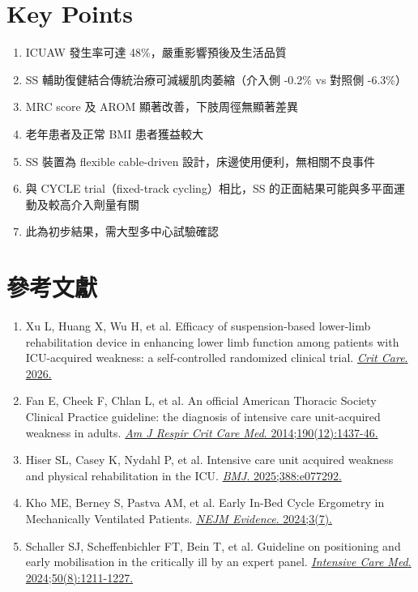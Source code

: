 \documentclass[11pt,a4paper]{article}
\begin{document}
\section{Key Points}

\begin{enumerate}
    \item ICUAW 發生率可達 48\%，嚴重影響預後及生活品質
    \item SS 輔助復健結合傳統治療可減緩肌肉萎縮（介入側 -0.2\% vs 對照側 -6.3\%）
    \item MRC score 及 AROM 顯著改善，下肢周徑無顯著差異
    \item 老年患者及正常 BMI 患者獲益較大
    \item SS 裝置為 flexible cable-driven 設計，床邊使用便利，無相關不良事件
    \item 與 CYCLE trial（fixed-track cycling）相比，SS 的正面結果可能與多平面運動及較高介入劑量有關
    \item 此為初步結果，需大型多中心試驗確認
\end{enumerate}

\section{參考文獻}

\begin{enumerate}
    \item Xu L, Huang X, Wu H, et al. Efficacy of suspension-based lower-limb rehabilitation device in enhancing lower limb function among patients with ICU-acquired weakness: a self-controlled randomized clinical trial. \href{https://doi.org/10.1186/s13054-026-05840-1}{\textit{Crit Care}. 2026.}

    \item Fan E, Cheek F, Chlan L, et al. An official American Thoracic Society Clinical Practice guideline: the diagnosis of intensive care unit-acquired weakness in adults. \href{https://doi.org/10.1164/rccm.201411-2011ST}{\textit{Am J Respir Crit Care Med}. 2014;190(12):1437-46.}

    \item Hiser SL, Casey K, Nydahl P, et al. Intensive care unit acquired weakness and physical rehabilitation in the ICU. \href{https://doi.org/10.1136/bmj-2023-077292}{\textit{BMJ}. 2025;388:e077292.}

    \item Kho ME, Berney S, Pastva AM, et al. Early In-Bed Cycle Ergometry in Mechanically Ventilated Patients. \href{https://doi.org/10.1056/EVIDoa2400137}{\textit{NEJM Evidence}. 2024;3(7).}

    \item Schaller SJ, Scheffenbichler FT, Bein T, et al. Guideline on positioning and early mobilisation in the critically ill by an expert panel. \href{https://doi.org/10.1007/s00134-024-07532-2}{\textit{Intensive Care Med}. 2024;50(8):1211-1227.}
\end{enumerate}
\end{document}
